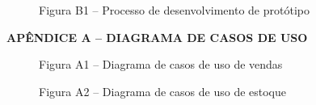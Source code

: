 \documentclass[
	article,			%
	12pt,				%
	oneside,			%
	a4paper,			%
	english,			%
	brazil,				%
	sumario=tradicional
]{abntex2}
\begin{document}
\begin{figure}[h]
    \centering
    \caption*{Figura B1 -- Processo de desenvolvimento de protótipo}
    \label{fig:anexoB}
\end{figure}

\clearpage
\begin{center}
    \textbf{APÊNDICE A -- DIAGRAMA DE CASOS DE USO}
\end{center}

\begin{figure}[h]
    \centering
    \caption*{Figura A1 -- Diagrama de casos de uso de vendas}
    \label{fig:apendiceA1}
\end{figure}

\begin{figure}[h]
    \centering
    \caption*{Figura A2 -- Diagrama de casos de uso de estoque}
    \label{fig:apendiceA2}
\end{figure}
\end{document}
